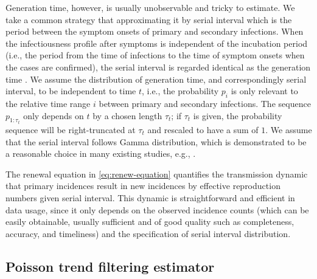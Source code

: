 Generation time, however, is usually unobservable and tricky to estimate. We take a common strategy that approximating it by serial interval which is the period between the symptom onsets of primary and secondary infections. When the infectiousness profile after symptoms is independent of the incubation period (i.e., the period from the time of infections to the time of symptom onsets when the cases are confirmed), the serial interval is regarded identical as the generation time \citep{cori2013new}. 
We assume the distribution of generation time, and correspondingly serial interval, to be independent to time $t$, i.e., the probability $p_i$ is only relevant to the relative time range $i$ between primary and secondary infections. The sequence $p_{1:\tau_t}$ only depends on $t$ by a chosen length $\tau_t$; if $\tau_t$ is given, the probability sequence will be right-truncated at $\tau_t$ and rescaled to have a sum of $1$. 
We assume that the serial interval follows Gamma distribution, which is demonstrated to be a reasonable choice in many existing studies, e.g., \cite{cori2013new,abry2020spatial,pascal2022nonsmooth}.


The renewal equation in \eqref{eq:renew-equation} quantifies the transmission dynamic that primary incidences result in new incidences by effective reproduction numbers given serial interval. This dynamic is straightforward and efficient in data usage, since it only depends on the observed incidence counts (which can be easily obtainable, usually sufficient and of good quality such as completeness, accuracy, and timeliness) and the specification of serial interval distribution. 

\subsection{Poisson trend filtering estimator} %

